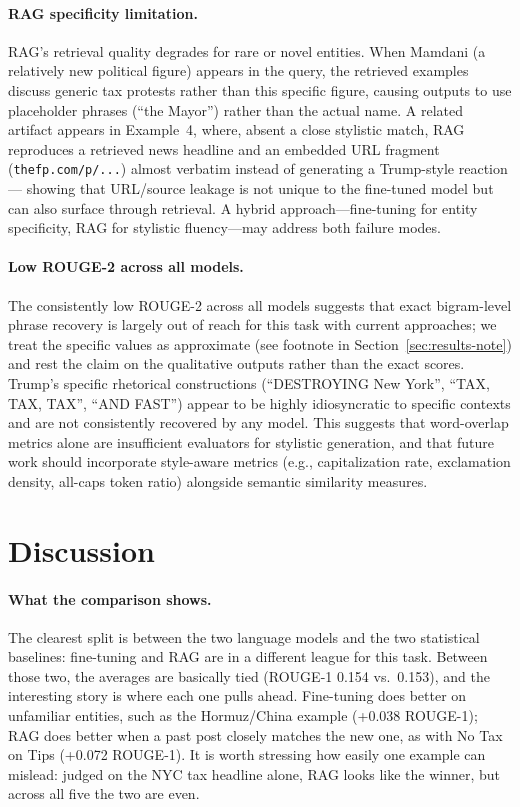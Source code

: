 \documentclass[11pt,a4paper]{article}
\begin{document}
\paragraph{RAG specificity limitation.}
RAG's retrieval quality degrades for rare or novel entities. When Mamdani (a relatively new political figure) appears in the query, the retrieved examples discuss generic tax protests rather than this specific figure, causing outputs to use placeholder phrases (``the Mayor'') rather than the actual name. A related artifact appears in Example~4, where, absent a close stylistic match, RAG reproduces a retrieved news headline and an embedded URL fragment (\texttt{thefp.com/p/...}) almost verbatim instead of generating a Trump-style reaction --- showing that URL/source leakage is not unique to the fine-tuned model but can also surface through retrieval. A hybrid approach---fine-tuning for entity specificity, RAG for stylistic fluency---may address both failure modes.

\paragraph{Low ROUGE-2 across all models.}
The consistently low ROUGE-2 across all models suggests that exact bigram-level phrase recovery is largely out of reach for this task with current approaches; we treat the specific values as approximate (see footnote in Section~\ref{sec:results-note}) and rest the claim on the qualitative outputs rather than the exact scores. Trump's specific rhetorical constructions (``DESTROYING New York'', ``TAX, TAX, TAX'', ``AND FAST'') appear to be highly idiosyncratic to specific contexts and are not consistently recovered by any model. This suggests that word-overlap metrics alone are insufficient evaluators for stylistic generation, and that future work should incorporate style-aware metrics (e.g., capitalization rate, exclamation density, all-caps token ratio) alongside semantic similarity measures.

\section{Discussion}

\paragraph{What the comparison shows.}
The clearest split is between the two language models and the two statistical baselines: fine-tuning and RAG are in a different league for this task. Between those two, the averages are basically tied (ROUGE-1 0.154 vs.\ 0.153), and the interesting story is where each one pulls ahead. Fine-tuning does better on unfamiliar entities, such as the Hormuz/China example (+0.038 ROUGE-1); RAG does better when a past post closely matches the new one, as with No Tax on Tips (+0.072 ROUGE-1). It is worth stressing how easily one example can mislead: judged on the NYC tax headline alone, RAG looks like the winner, but across all five the two are even.
\end{document}
